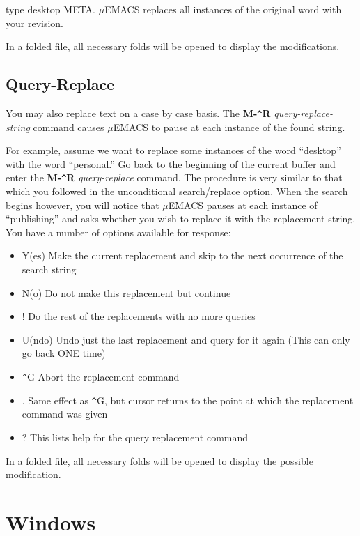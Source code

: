 type desktop META. $\mu$EMACS replaces all instances of the original
word with your revision. 

In a folded file, all necessary folds will be opened to display the 
modifications.
\section{Query-Replace}

You may also replace text on a case by case basis. The {\bf
M-\verb+^+R} {\it query-replace-string} command causes $\mu$EMACS to
pause at each instance of the found string.

For example, assume we want to replace some instances of the word
``desktop'' with the word ``personal.'' Go back to the beginning of the
current buffer and enter the {\bf M-\verb+^+R} {\it query-replace}
command. The procedure is very similar to that which you followed in
the unconditional search/replace option. When the search begins
however, you will notice that $\mu$EMACS pauses at each instance of
``publishing'' and asks whether you wish to replace it with the
replacement string. You have a number of options available for
response:

\begin{itemize}
\item Y(es) Make the current replacement and skip to the next
occurrence of the search string
\item N(o) Do not make this replacement but continue
\item ! Do the rest of the replacements with no more queries
\item U(ndo) Undo just the last replacement and query for it
again (This can only go back ONE time)
\item \verb+^+G Abort the replacement command
\item . Same effect as \verb+^+G, but cursor returns to the point at
which the replacement command was given
\item ? This lists help for the query replacement command
\end{itemize}

In a folded file, all necessary folds will be opened to display the 
possible modification.

\chapter{Windows}

